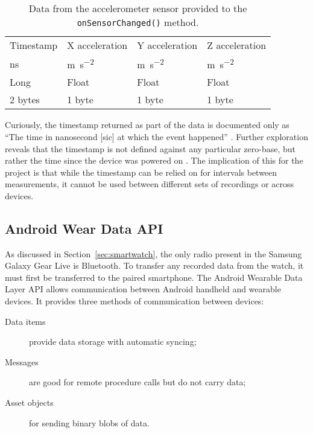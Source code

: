       \begin{table}
        \tabcolsep=0.11cm
        \centering
        \begin{tabu} to \linewidth {|X[2,c] | X[c] | X[c] | X[c] |}
          \hline
          Timestamp & X acceleration & Y acceleration & Z acceleration \\
          \si{ns} & \si{\metre\per\square\second} & \si{\metre\per\square\second} & \si{\metre\per\square\second} \\
          Long & Float & Float & Float \\
          2 bytes & 1 byte & 1 byte & 1 byte \\
          \hline
        \end{tabu}
        \caption{Data from the accelerometer sensor provided to the \texttt{onSensorChanged()} 
            method.}
        \label{tab:data-row}
      \end{table}
      
      Curiously, the timestamp returned as part of the data is documented only as ``The time in nanosecond [sic] at which the event happened'' \cite{androidsensoreventapi}. Further exploration reveals that the timestamp is not defined against any particular zero-base, but rather the time since the device was powered on \cite{androidissuedocumentationbug, androidissuehardwarebug}. The implication of this for the project is that while the timestamp can be relied on for intervals between measurements, it cannot be used between different sets of recordings or across devices.
      

    \subsection{Android Wear Data API}
      \label{sec:prep-data-api}
      As discussed in Section~\ref{sec:smartwatch}, the only radio present in the Samsung Galaxy 
      Gear Live is Bluetooth. To transfer any recorded data from the watch, it must first be transferred to the paired smartphone. 
      The Android Wearable Data Layer API allows communication between Android handheld and wearable
      devices. It provides three methods of communication between devices:
      \begin{description}
        \item[Data items] provide data storage with automatic syncing;
        \item[Messages] are good for remote procedure calls but do not carry data;
        \item[Asset objects] for sending binary blobs of data.
      \end{description}
      
